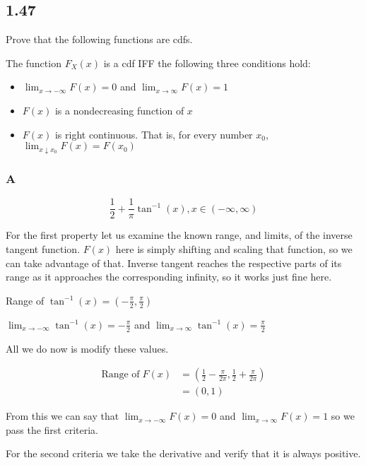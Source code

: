\subsection*{1.47}

Prove that the following functions are cdfs.

\begin{theorem}[1.5.3]
	The function $F_X(x)$ is a cdf IFF the following three conditions hold:
	\begin{itemize}
		\item $\lim_{x \to -\infty}F(x) = 0$ and $\lim_{x \to \infty}F(x) = 1$
		\item $F(x)$ is a nondecreasing function of $x$
		\item $F(x)$ is right continuous. That is, for every number $x_0$, $\lim_{x \downarrow x_0}F(x) = F(x_0)$
	\end{itemize}
\end{theorem}

\subsubsection*{A}

\[
	\frac{1}{2} + \frac{1}{\pi} \tan^{-1}(x), x \in (-\infty, \infty)
\]

For the first property let us examine the known range, and limits, of the inverse tangent function. $F(x)$ here is simply shifting and scaling that function, so we can take advantage of that. Inverse tangent reaches the respective parts of its range as it approaches the corresponding infinity, so it works just fine here.

Range of $\tan^{-1}(x) = (-\frac{\pi}{2}, \frac{\pi}{2})$

$\lim_{x \to -\infty}\tan^{-1}(x) = -\frac{\pi}{2}$ and $\lim_{x \to \infty} \tan^{-1}(x) = \frac{\pi}{2}$

All we do now is modify these values.

\begin{align*}
\text{Range of}\; F(x) &= \left(\frac{1}{2} - \frac{\pi}{2\pi}, \frac{1}{2} + \frac{\pi}{2\pi}\right) \\
	&= (0, 1)
\end{align*}

From this we can say that $\lim_{x \to -\infty}F(x) = 0$ and $\lim_{x \to \infty}F(x) = 1$ so we pass the first criteria. 

For the second criteria we take the derivative and verify that it is always positive.


